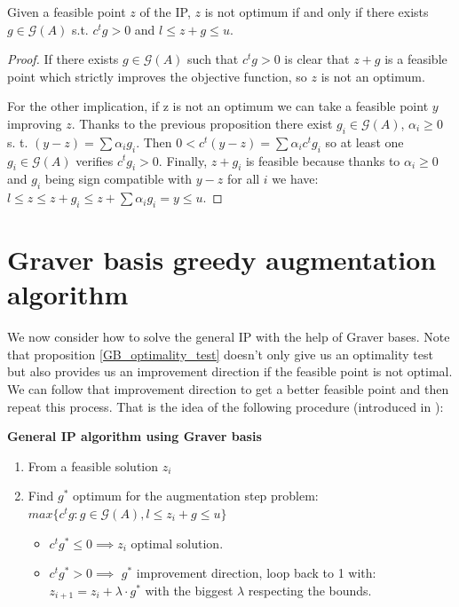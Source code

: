 \begin{proposition}\label{GB_optimality_test}
Given a feasible point $z$ of the IP, $z$ is not optimum if and only if there exists $g \in \mathcal{G}(A)$ s.t. $c^tg > 0$ and $l \leq z + g \leq u$.
\end{proposition}
\vspace{-20pt}
\begin{proof}
If there exists $g \in \mathcal{G}(A)$ such that $c^tg > 0$ is clear that $z + g$ is a feasible point which strictly improves the objective function, so $z$ is not an optimum. 

For the other implication, if z is not an optimum we can take a feasible point $y$ improving $z$. Thanks to the previous proposition there exist $g_i \in \mathcal{G}(A)$, $\alpha_i \geq 0$ s. t. $(y - z) = \sum \alpha_i g_i$. Then $0 < c^t(y - z) = \sum \alpha_i c^t g_i$ so at least one $g_i \in \mathcal{G}(A)$ verifies $c^tg_i > 0$. Finally, $z + g_i$ is feasible because thanks to $\alpha_i \geq 0$ and $g_i$ being sign compatible with $y - z$ for all $i$ we have: $l \leq z \leq z + g_i \leq z + \sum \alpha_i g_i = y \leq u$.

\end{proof}

\section{Graver basis greedy augmentation algorithm}

We now consider how to solve the general IP with the help of Graver bases. Note that proposition \ref{GB_optimality_test} doesn't only give us an optimality test but also provides us an improvement direction if the feasible point is not optimal. We can follow that improvement direction to get a better feasible point and then repeat this process. That is the idea of the following procedure (introduced in \cite{GRAVER:1975}):


\textbf{General IP algorithm using Graver basis} \label{GB_greedy_algorithm}
\vspace{-8pt}
\begin{enumerate}
    \item From a feasible solution $z_i$
    \item Find $g^*$ optimum for the augmentation step problem: \vspace{4pt}\\
          $max\{c^tg : g \in \mathcal{G}(A), l \leq z_i + g \leq u \}$ \vspace{4pt}
    \begin{itemize}
        \item $c^tg^* \leq 0 \implies z_i$ optimal solution.
        \item $c^tg^* > 0 \implies$ $g^*$ improvement direction, loop back to 1 with:\\ $z_{i+1} = z_i + \lambda \cdot g^*$ with the biggest $\lambda$ respecting the bounds.
    \end{itemize}
\end{enumerate}

